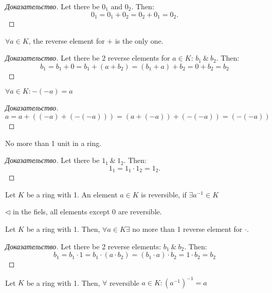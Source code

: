 \begin{proof}[Доказательство]
	Let there be $0_1$ and $0_2$. Then: \[
		0_1 = 0_1 + 0_2 = 0_2 + 0_1 = 0_2.
	\]
\end{proof}

\begin{property}[]
	$\forall a \in K$, the reverse element for $+$ is the only one. 	
\end{property}
\begin{proof}[Доказательство]
	Let there be 2 reverse elements for $a \in K$: $b_1 \ \& \ b_2$. Then: \[
		b_1 = b_1 + 0 = b_1 + (a + b_2) = (b_1 + a) + b_2 = 0 + b_2 = b_2
	\]
\end{proof}

\begin{property}[]
	$\forall a \in K: -(-a) = a$
\end{property}

\begin{proof}[Доказательство]
	$a = a + ((-a) + (-(-a))) = (a + (-a)) + (-(-a)) = (-(-a))$
\end{proof}

\begin{property}[]
	No more than 1 unit in a ring.
\end{property}

\begin{proof}[Доказательство]
	Let there be $1_1 \ \& \ 1_2$. Then: \[
		1_1 = 1_1 \cdot 1_2 = 1_2.
	\]
\end{proof}

\begin{definition}[]
	Let $K$ be a ring with 1. An element $a \in K$ is reversible, if $\exists a^{-1} \in K$
\end{definition}

$\triangleleft$ in the fiels, all elements except 0 are reversible.

\begin{property}[]
	Let $K$ be a ring with 1. Then, $\forall a \in K \exists$ no more than 1 reverse element for $\cdot $.
\end{property}

\begin{proof}[Доказательство]
	Let there be 2 reverse elements: $b_1 \ \& \ b_2$. Then: \[
		b_1 = b_1 \cdot 1 = b_1 \cdot (a \cdot b_2) = (b_1 \cdot a) \cdot b_2 = 1 \cdot b_2 = b_2
	\]
\end{proof}

\begin{property}[]
	 Let $K$ be a ring with 1. Then, $\forall$ reversible $a \in K: (a^{-1})^{-1} = a$
\end{property}

